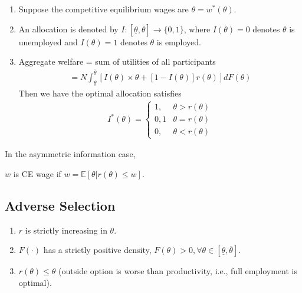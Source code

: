 \documentclass[11pt]{elegantbook}
\begin{document}
\begin{enumerate}[$\circ$]
    \item Suppose the competitive equilibrium wages are $\theta=w^*(\theta)$.
    \item An allocation is denoted by $I:\left[\underline{\theta},\overline{\theta}\right] \rightarrow \{0,1\}$, where $I(\theta)=0$ denotes $\theta$ is unemployed and $I(\theta)=1$ denotes $\theta$ is employed.
    \item Aggregate welfare = sum of utilities of all participants
    \begin{equation}
        \begin{aligned}
            =N\int_{\underline{\theta}}^{\overline{\theta}} \left[I(\theta)\times\theta+[1-I(\theta)]r(\theta)\right]dF(\theta)
        \end{aligned}
        \nonumber
    \end{equation}
    Then we have the optimal allocation satisfies
    \begin{equation}
        \begin{aligned}
            I^*(\theta)=\left\{\begin{matrix}
                1,&\theta>r(\theta)\\
                0,1&\theta=r(\theta)\\
                0,&\theta<r(\theta)
            \end{matrix}\right.
        \end{aligned}
        \nonumber
    \end{equation}
\end{enumerate}
In the asymmetric information case,
\begin{definition}
\normalfont
$w$ is CE wage if $w=\mathbb{E}[\theta|r(\theta)\leq w]$.
\end{definition}

\subsection{Adverse Selection}
\begin{assumption}
    \begin{enumerate}[({A}1).]
        \item $r$ is strictly increasing in $\theta$.
        \item $F(\cdot)$ has a strictly positive density, $F(\theta)>0, \forall \theta\in \left[\underline{\theta},\overline{\theta}\right]$.
        \item $r(\theta)\leq\theta$ (outside option is worse than productivity, i.e., full employment is optimal).
    \end{enumerate}
\end{assumption}
\end{document}
